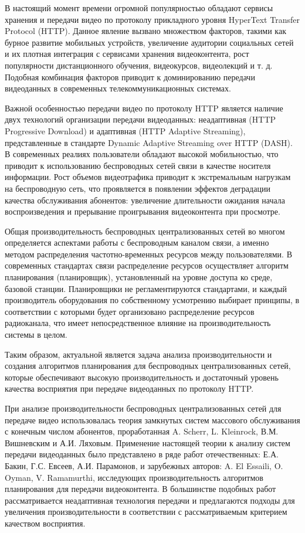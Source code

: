 {\actuality}
В настоящий момент времени огромной популярностью обладают сервисы хранения и передачи видео по протоколу прикладного уровня HyperText Transfer Protocol (HTTP). Данное явление вызвано множеством факторов, такими как бурное развитие мобильных устройств, увеличение аудитории социальных сетей и их плотная интеграция с сервисами хранения видеоконтента, рост популярности дистанционного обучения, видеокурсов, видеолекций и т. д. Подобная комбинация факторов приводит к доминированию передачи видеоданных в современных телекоммуникационных системах.

Важной особенностью передачи видео по протоколу HTTP является наличие двух технологий организации передачи видеоданных: неадаптивная (HTTP Progressive Download) и адаптивная (HTTP Adaptive Streaming), представленные в стандарте Dynamic Adaptive Streaming over HTTP (DASH). В современных реалиях пользователи обладают высокой мобильностью, что приводит к использованию беспроводных сетей связи в качестве носителя информации. Рост объемов видеотрафика приводит к экстремальным нагрузкам на беспроводную сеть, что проявляется в появлении эффектов деградации качества обслуживания абонентов: увеличение длительности ожидания начала воспроизведения и прерывание проигрывания видеоконтента при просмотре.

Общая производительность беспроводных централизованных сетей во многом определяется аспектами работы с беспроводным каналом связи, а именно методом распределения частотно-временных ресурсов между пользователями. В современных стандартах связи распределение ресурсов осуществляет алгоритм планирования (планировщик), установленный на уровне доступа ко среде, базовой станции. Планировщики не регламентируются стандартами, и каждый производитель оборудования по собственному усмотрению выбирает принципы, в соответствии с которыми будет организовано распределение ресурсов радиоканала, что имеет непосредственное влияние на производительность системы в целом.

Таким образом, актуальной является задача анализа производительности и создания алгоритмов планирования для беспроводных централизованных сетей, которые обеспечивают высокую производительность и достаточный уровень качества восприятия при передаче видеоданных по протоколу HTTP.

При анализе производительности беспроводных централизованных сетей для передаче видео использовалась теория замкнутых систем массового обслуживания с конечным числом абонентов, проработанная A. Scherr, L. Kleinrock, В.М. Вишневским и А.И. Ляховым. Применение настоящей теории к анализу систем передачи видеоданных было представлено в ряде работ отечественных: Е.А. Бакин, Г.С. Евсеев, А.И. Парамонов, и зарубежных авторов: A. El Essaili, O. Oyman, V. Ramamurthi, исследующих производительность алгоритмов планирования для передачи видеоконтента. В большинстве подобных работ рассматривается неадаптивная технология передачи и предлагаются подходы для увеличения производительности в соответствии с рассматриваемым критерием качеством восприятия.

